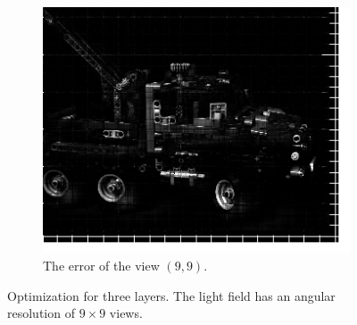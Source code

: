 \documentclass[11pt,a4paper,titlepage]{article}
\begin{document}
\begin{figure}[h]
\begin{subfigure}[t]{0.4\textwidth}
		\includegraphics[width=\textwidth]{results/legotruck_perspective_rec_3Layers_r=0/custom_view_error.png}
		\caption{The error of the view $\left( 9, 9 \right)$.}
	\end{subfigure}

	\caption{Optimization for three layers. The light field has an angular resolution of $9\times 9$ views.}
\end{figure}
\end{document}
